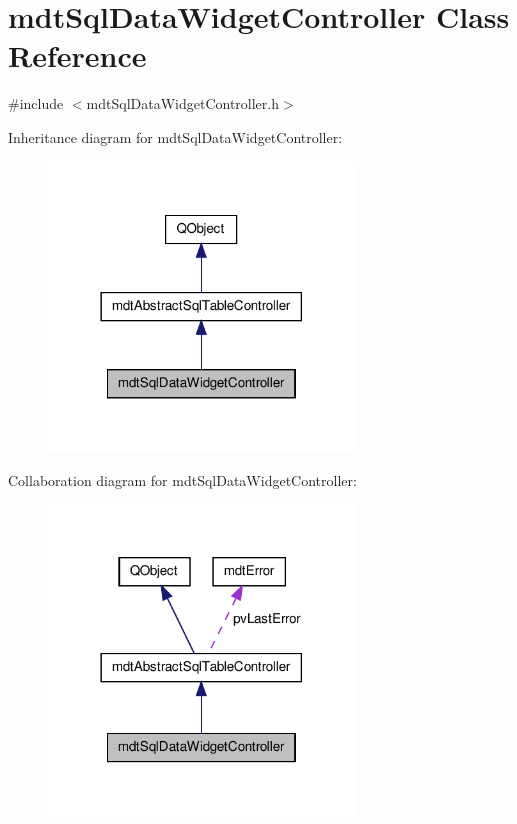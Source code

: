 \hypertarget{classmdt_sql_data_widget_controller}{\section{mdt\-Sql\-Data\-Widget\-Controller Class Reference}
\label{classmdt_sql_data_widget_controller}
}


{\ttfamily \#include $<$mdt\-Sql\-Data\-Widget\-Controller.\-h$>$}



Inheritance diagram for mdt\-Sql\-Data\-Widget\-Controller\-:
\nopagebreak
\begin{figure}[H]
\begin{center}
\leavevmode
\includegraphics[width=230pt]{classmdt_sql_data_widget_controller__inherit__graph}
\end{center}
\end{figure}


Collaboration diagram for mdt\-Sql\-Data\-Widget\-Controller\-:
\nopagebreak
\begin{figure}[H]
\begin{center}
\leavevmode
\includegraphics[width=230pt]{classmdt_sql_data_widget_controller__coll__graph}
\end{center}
\end{figure}
